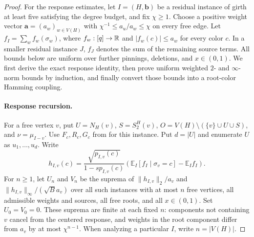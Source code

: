 \begin{proof}
For the response estimates, let $I=(H,\mathbf b)$ be a residual instance
of girth at least five satisfying the degree budget, and fix $\chi\ge1$.
Choose a positive weight vector $\mathbf a=(a_w)_{w\in V(H)}$ with
$\chi^{-1}\le a_u/a_w\le\chi$ on every free edge.  Let
$f_I=\sum_w f_w(\sigma_w)$, where $f_w:[q]\to\mathbb R$ and
$|f_w(c)|\le a_w$ for every color $c$.  In a smaller residual instance
$J$, $f_J$ denotes the sum of the remaining source terms.  All bounds below
are uniform over further pinnings, deletions, and $x\in(0,1)$.
We first derive the exact response identity, then prove uniform weighted
$2$- and $\infty$-norm bounds by induction, and finally convert those bounds
into a root-color Hamming coupling.

\paragraph{Response recursion.}
For a free vertex $v$, put $U=N_H(v)$, $S=S_2^H(v)$,
$O=V(H)\setminus(\{v\}\cup U\cup S)$, and $\nu=\mu_{I-v}$.
Use $F_c,R_c,G_c$ from  for this instance.
Put $d=|U|$ and enumerate $U$ as $u_1,\ldots,u_d$.  Write
\begin{equation}\label{eq:girth5-score}
 h_{I,v}(c)=\frac{\sqrt{p_{I,v}(c)}}{1-sp_{I,v}(c)}
 \left(\mathbb E_I[f_I\mid\sigma_v=c]-\mathbb E_I f_I\right).
\end{equation}
For $n\ge1$, let $U_n$ and $V_n$ be the suprema of
$\|h_{I,v}\|_2/a_v$ and $\|h_{I,v}\|_\infty/(\sqrt B a_v)$ over all
such instances with at most $n$ free vertices, all admissible weights and
sources, all free roots, and all $x\in(0,1)$.  Set $U_0=V_0=0$.
These suprema are finite at each fixed $n$: components not containing $v$
cancel from the centered response, and weights in the root component differ
from $a_v$ by at most $\chi^{n-1}$.  When analyzing a particular $I$, write
$n=|V(H)|$.


\end{proof}
